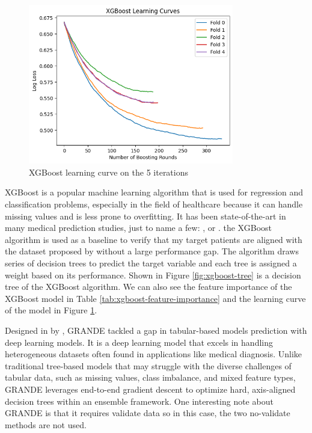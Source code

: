 \documentclass[../main.tex]{subfiles}
\begin{document}
\begin{figure}
    \centering
    \includegraphics[width=0.8\textwidth]{Figure/xgb-learning-curve.png}
    \caption{XGBoost learning curve on the 5 iterations}
    \label{fig:xgboost-learning-curve}
\end{figure}

XGBoost is a popular machine learning algorithm that is used for regression and classification problems, especially in the field of healthcare because it can handle missing values and is less prone to overfitting.
It has been state-of-the-art in many medical prediction studies, just to name a few: ,  or .
the XGBoost algorithm is used as a baseline to verify that my target patients are aligned with the dataset proposed by \citeauthor{xgboost-aki-dka} \cite{xgboost-aki-dka} without a large performance gap.
The algorithm draws series of decision trees to predict the target variable and each tree is assigned a weight based on its performance.
Shown in Figure \ref{fig:xgboost-tree} is a decision tree of the XGBoost algorithm.
We can also see the feature importance of the XGBoost model in Table \ref{tab:xgboost-feature-importance} and the learning curve of the model in Figure \ref{fig:xgboost-learning-curve}.


Designed in \citeyear{GRANDE-source} by \citeauthor{GRANDE-source} \cite{GRANDE-source}, GRANDE tackled a gap in tabular-based models prediction with deep learning models.
It is a deep learning model that excels in handling heterogeneous datasets often found in applications like medical diagnosis.
Unlike traditional tree-based models that may struggle with the diverse challenges of tabular data, such as missing values, class imbalance, and mixed feature types, GRANDE leverages end-to-end gradient descent to optimize hard, axis-aligned decision trees within an ensemble framework.
One interesting note about GRANDE is that it requires validate data so in this case, the two no-validate methods are not used.
\end{document}
